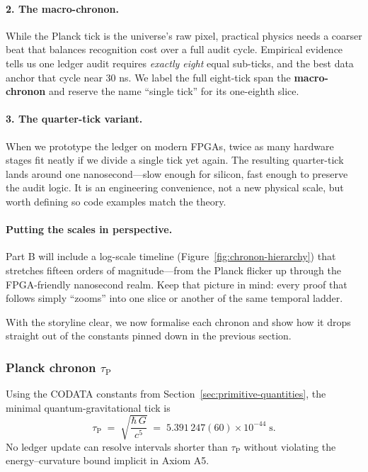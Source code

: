 \documentclass[11pt,oneside]{book}
\begin{document}
\paragraph{2.  The macro-chronon.}
While the Planck tick is the universe’s raw pixel, practical physics needs a
coarser beat that balances recognition cost over a full audit cycle.  Empirical
evidence tells us one ledger audit requires \emph{exactly eight} equal sub-ticks,
and the best data anchor that cycle near 30 ns.  We label the full eight-tick
span the \textbf{macro-chronon} and reserve the name “single tick” for its
one-eighth slice.

\paragraph{3.  The quarter-tick variant.}
When we prototype the ledger on modern FPGAs, twice as many hardware stages fit
neatly if we divide a single tick yet again.  The resulting quarter-tick lands
around one nanosecond—slow enough for silicon, fast enough to preserve the
audit logic.  It is an engineering convenience, not a new physical scale, but
worth defining so code examples match the theory.

\paragraph{Putting the scales in perspective.}
Part B will include a log-scale timeline (Figure~\ref{fig:chronon-hierarchy})
that stretches fifteen orders of magnitude—from the Planck flicker up through
the FPGA-friendly nanosecond realm.  Keep that picture in mind: every proof
that follows simply “zooms” into one slice or another of the same temporal
ladder.

With the storyline clear, we now formalise each chronon and show how it drops
straight out of the constants pinned down in the previous section.


\subsubsection{Planck chronon \texorpdfstring{$\tau_{\text{P}}$}{tauP}}
\label{subsubsec:planck-chronon}

Using the CODATA constants from Section~\ref{sec:primitive-quantities}, the
minimal quantum-gravitational tick is
\[
  \tau_{\text{P}}
    \;=\;
    \sqrt{\frac{\hbar\,G}{c^{5}}}
    \;=\;
    5.391\,247(60)\times10^{-44}\;\text{s}.
\]
No ledger update can resolve intervals shorter than $\tau_{\text{P}}$ without
violating the energy–curvature bound implicit in Axiom A5.
\end{document}
